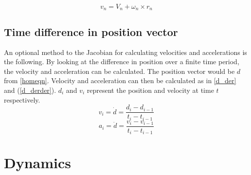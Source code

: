 \vspace{-0.5cm}
\begin{equation}\label{absvel}
v_{n}=V_n+\omega_n\times r_n
\end{equation}
\vspace{-0.5cm}

%
%

\subsection{Time difference in position vector}

An optional method to the Jacobian for calculating velocities and accelerations is the following. By looking at the difference in position over a finite time period, the velocity and acceleration can be calculated. The position vector would be $d$ from \eqref{homeqn}. Velocity and acceleration can then be calculated as in \eqref{d_der} and (\ref{d_derder}). $d_i$ and $v_i$ represent the position and velocity at time $t$ respectively.
\vspace{0.3cm}
\begin{equation}\label{d_der}
v_i = \dot{d} = \frac{d_{i}-d_{i-1}}{t_i-t_{i-1}}
\end{equation}
\vspace{-0.2cm}
\begin{equation}\label{d_derder}
a_i = \ddot{d} = \frac{v_{i}-v_{i-1}}{t_i-t_{i-1}}
\end{equation}
\vspace{-1cm}
\section{Dynamics}

